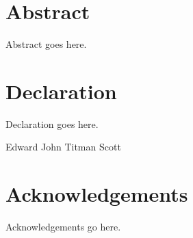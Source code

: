 \chapter*{\centering Abstract}
Abstract goes here.




\chapter*{\centering Declaration}
Declaration goes here.


\begin{flushright}
    Edward John Titman Scott
\end{flushright}


\chapter*{\centering Acknowledgements}
Acknowledgements go here.


\tableofcontents
\listoffigures
\listoftables




\cleardoublepage
